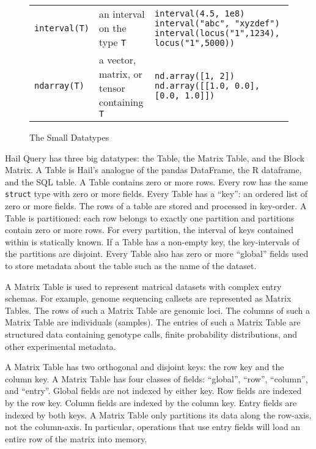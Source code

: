 \documentclass[10pt,a4paper%
]{article}
\begin{document}
\begin{figure}[h]
\begin{adjustbox}{minipage=19cm, center}
\begin{tabularx}{\textwidth}{>{\raggedright\arraybackslash}llX}
      \texttt{interval(T)} & an interval on the type \texttt{T} & \texttt{\footnotesize interval(4.5, 1e8)} \newline \texttt{\footnotesize interval("abc", "xyzdef")} \newline \texttt{\footnotesize interval(locus("1",1234), locus("1",5000))} \\
      \texttt{ndarray(T)} & a vector, matrix, or tensor containing \texttt{\footnotesize T} & \texttt{\footnotesize nd.array([1, 2])} \newline \texttt{\footnotesize nd.array([[1.0, 0.0], [0.0, 1.0]])} \\
    \end{tabularx}
  \end{adjustbox}
  \caption{The Small Datatypes}
  \label{fig:small-datatypes}
\end{figure}

Hail Query has three big datatypes: the Table, the Matrix Table, and the Block Matrix.
A Table is Hail's analogue of the pandas DataFrame, the R dataframe, and the SQL table.
A Table contains zero or more rows.
Every row has the same \texttt{struct} type with zero or more fields.
Every Table has a ``key'': an ordered list of zero or more fields.
The rows of a table are stored and processed in key-order.
A Table is partitioned: each row belongs to exactly one partition and partitions contain zero or more rows.
For every partition, the interval of keys contained within is statically known.
If a Table has a non-empty key, the key-intervals of the partitions are disjoint.
Every Table also has zero or more ``global'' fields used to store metadata about the table such as the name of the dataset.

A Matrix Table is used to represent matrical datasets with complex entry schemas.
For example, genome sequencing callsets are represented as Matrix Tables.
The rows of such a Matrix Table are genomic loci.
The columns of such a Matrix Table are individuals (samples).
The entries of such a Matrix Table are structured data containing genotype calls, finite probability distributions, and other experimental metadata.

A Matrix Table has two orthogonal and disjoint keys: the row key and the column key.
A Matrix Table has four classes of fields: ``global'', ``row'', ``column'', and ``entry''.
Global fields are not indexed by either key.
Row fields are indexed by the row key.
Column fields are indexed by the column key.
Entry fields are indexed by both keys.
A Matrix Table only partitions its data along the row-axis, not the column-axis.
In particular, operations that use entry fields will load an entire row of the matrix into memory.
\end{document}
